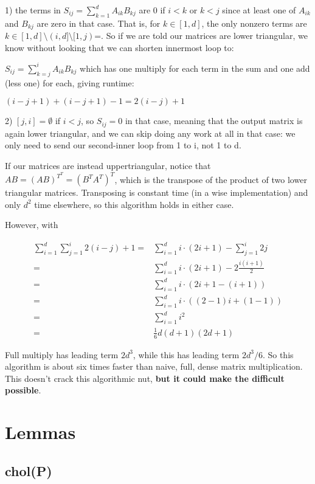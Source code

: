 \documentclass[english]{article}
\begin{document}
1) the terms in $S_{ij}=\sum_{k=1}^{d}A_{ik}B_{kj}$ are $0$ if $i<k$
or $k<j$ since at least one of $A_{ik}$ and $B_{kj}$ are zero in
that case. That is, for $k\in[1,d]$, the only nonzero terms are $k\in[1,d]\setminus(i,d]\setminus[1,j)$=.
So if we are told our matrices are lower triangular, we know without
looking that we can shorten innermost loop to:

$S_{ij}=\sum_{k=j}^{i}A_{ik}B_{kj}$ which has one multiply for each
term in the sum and one add (less one) for each, giving runtime:

$(i-j+1)+(i-j+1)-1=2(i-j)+1$

2) $[j,i]=\emptyset$ if $i<j$, so $S_{ij}=0$ in that case, meaning
that the output matrix is again lower triangular, and we can skip
doing any work at all in that case: we only need to send our second-inner
loop from 1 to i, not 1 to d.

If our matrices are instead uppertriangular, notice that $AB=(AB)^{T^{T}}=(B^{T}A^{T})^{T}$,
which is the transpose of the product of two lower triangular matrices.
Transposing is constant time (in a wise implementation) and only $d^{2}$
time elsewhere, so this algorithm holds in either case.

However, with

\begin{align*}
\sum_{i=1}^{d}\sum_{j=1}^{i}2(i-j)+1= & \sum_{i=1}^{d}i\cdot(2i+1)-\sum_{j=1}^{i}2j\\
= & \sum_{i=1}^{d}i\cdot(2i+1)-2\frac{i(i+1)}{2}\\
= & \sum_{i=1}^{d}i\cdot(2i+1-(i+1))\\
= & \sum_{i=1}^{d}i\cdot((2-1)i+(1-1))\\
= & \sum_{i=1}^{d}i^{2}\\
= & \frac{1}{6}d(d+1)(2d+1)
\end{align*}


Full multiply has leading term $2d^{3}$, while this has leading term
$2d^{3}/6$. So this algorithm is about six times faster than naive,
full, dense matrix multiplication. This doesn't crack this algorithmic
nut, \textbf{but it could make the difficult possible}.



\section*{Lemmas}

\subsection*{chol(P)}
\end{document}

